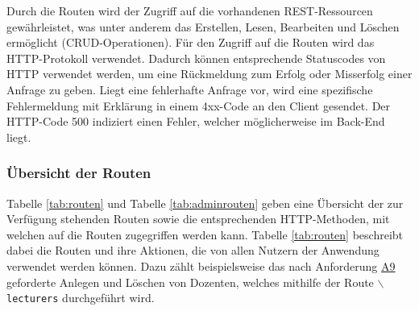 Durch die Routen wird der Zugriff auf die vorhandenen \ac{REST}-Ressourcen gewährleistet, was unter anderem das Erstellen, Lesen, Bearbeiten und Löschen ermöglicht (CRUD-Operationen).
Für den Zugriff auf die Routen wird das \acs{HTTP}-Protokoll verwendet.
Dadurch können entsprechende Statuscodes von \acs{HTTP} verwendet werden, um eine Rückmeldung zum Erfolg oder Misserfolg einer Anfrage zu geben. 
Liegt eine fehlerhafte Anfrage vor, wird eine spezifische Fehlermeldung mit Erklärung in einem 4xx-Code an den Client gesendet.
Der \acs{HTTP}-Code 500 indiziert einen Fehler, welcher möglicherweise im Back-End liegt.


\subsubsection{Übersicht der Routen}
Tabelle \vref{tab:routen} und Tabelle \vref{tab:adminrouten} geben eine Übersicht der zur Verfügung stehenden Routen sowie die entsprechenden \acs{HTTP}-Methoden, mit welchen auf die Routen zugegriffen werden kann. 
Tabelle \vref{tab:routen} beschreibt dabei die Routen und ihre Aktionen, die von allen Nutzern der Anwendung verwendet werden können.
Dazu zählt beispielsweise das nach Anforderung \hyperref[tab:Anforderungen]{A9} geforderte Anlegen und Löschen von Dozenten, welches mithilfe der Route \texttt{$\backslash$lecturers} durchgeführt wird. 

